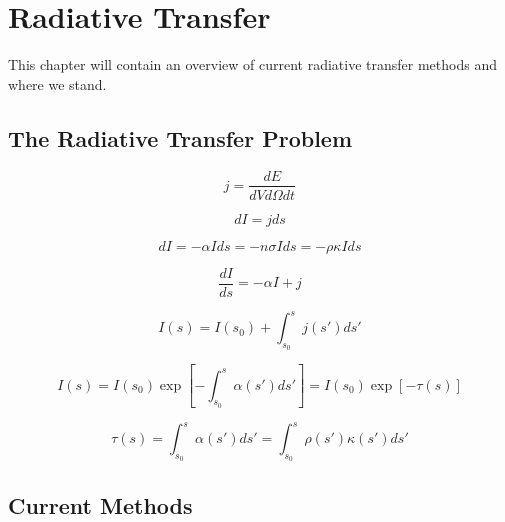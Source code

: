 \pagestyle{fancy}
\headheight 20pt
\chead{}
\lfoot{}
\cfoot{\thepage}
\rfoot{}
\renewcommand{\headrulewidth}{0.1pt}
\renewcommand{\footrulewidth}{0.1pt}

\chapter{Radiative Transfer}
\label{chap:radtransfer}

\thispagestyle{fancy}

This chapter will contain an overview of current radiative transfer methods and where we stand.

\section{The Radiative Transfer Problem}
\label{sec:rtformulation}


\begin{equation}
\label{eq:emissioncoef}
j = \frac{dE}{dV d\Omega dt}
\end{equation}

\begin{equation}
\label{eq:intensity}
dI = j ds
\end{equation}

\begin{equation}
\label{eq:absorption}
dI = -\alpha I ds = -n \sigma I ds = -\rho \kappa I ds
\end{equation}

\begin{equation}
\label{eq:radtransfer}
\frac{dI}{ds} = -\alpha I +j
\end{equation}

\begin{equation}
\label{eq:rademission}
I(s) = I(s_0) + \int_{s_0}^{s} j(s') ds'
\end{equation}

\begin{equation}
\label{eq:radabsorption}
I(s) = I(s_0)\exp{\left[-\int_{s_0}^{s} \alpha(s') ds'\right]} = I(s_0)\exp{\left[ -\tau (s) \right]}
\end{equation}

\begin{equation}
\label{eq:opticaldepth}
\tau(s) = \int_{s_0}^{s} \alpha (s') ds' = \int_{s_0}^{s} \rho (s') \kappa(s') ds'
\end{equation}


\section{Current Methods}